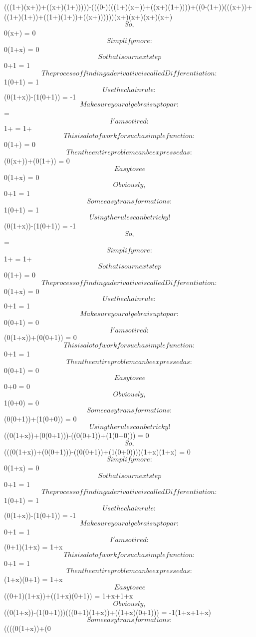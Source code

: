 \documentclass[12pt]{article}
\begin{document}
(((1+)\cdot (x+))+((x+)\cdot (1+)))))-(((0-)\cdot (((1+)\cdot (x+))+((x+)\cdot (1+))))+((0-(1+))\cdot ((\cdot (x+))+((1+)\cdot (1+))+((1+)\cdot (1+))+((x+)\cdot {})))))\cdot (x+)\cdot (x+)\cdot (x+)\cdot (x+)$$So, $$0\cdot (x+) = 0$$Simplify more: $$0\cdot (1+x) = 0$$So that is our next step$$0+1 = 1$$The process of finding a derivative is called Differentiation: $$1\cdot (0+1) = 1$$Use the chain rule: $$(0\cdot (1+x))-(1\cdot (0+1)) = -1$$Make sure your algebra is up to par: $$ = $$I'am so tired: $$1+ = 1+$$This is a lot of work for such a simple function: $$0\cdot (1+) = 0$$Then the entire problem can be expressed as: $$(0\cdot (x+))+(0\cdot (1+)) = 0$$Easy to see$$0\cdot (1+x) = 0$$Obviously, $$0+1 = 1$$Some easy transformations: $$1\cdot (0+1) = 1$$Using the rules can be tricky!$$(0\cdot (1+x))-(1\cdot (0+1)) = -1$$So, $$ = $$Simplify more: $$1+ = 1+$$So that is our next step$$0\cdot (1+) = 0$$The process of finding a derivative is called Differentiation: $$0\cdot (1+x) = 0$$Use the chain rule: $$0+1 = 1$$Make sure your algebra is up to par: $$0\cdot (0+1) = 0$$I'am so tired: $$(0\cdot (1+x))+(0\cdot (0+1)) = 0$$This is a lot of work for such a simple function: $$0+1 = 1$$Then the entire problem can be expressed as: $$0\cdot (0+1) = 0$$Easy to see$$0+0 = 0$$Obviously, $$1\cdot (0+0) = 0$$Some easy transformations: $$(0\cdot (0+1))+(1\cdot (0+0)) = 0$$Using the rules can be tricky!$$((0\cdot (1+x))+(0\cdot (0+1)))-((0\cdot (0+1))+(1\cdot (0+0))) = 0$$So, $$(((0\cdot (1+x))+(0\cdot (0+1)))-((0\cdot (0+1))+(1\cdot (0+0))))\cdot (1+x)\cdot (1+x) = 0$$Simplify more: $$0\cdot (1+x) = 0$$So that is our next step$$0+1 = 1$$The process of finding a derivative is called Differentiation: $$1\cdot (0+1) = 1$$Use the chain rule: $$(0\cdot (1+x))-(1\cdot (0+1)) = -1$$Make sure your algebra is up to par: $$0+1 = 1$$I'am so tired: $$(0+1)\cdot (1+x) = 1+x$$This is a lot of work for such a simple function: $$0+1 = 1$$Then the entire problem can be expressed as: $$(1+x)\cdot (0+1) = 1+x$$Easy to see$$((0+1)\cdot (1+x))+((1+x)\cdot (0+1)) = 1+x+1+x$$Obviously, $$((0\cdot (1+x))-(1\cdot (0+1)))\cdot (((0+1)\cdot (1+x))+((1+x)\cdot (0+1))) = -1\cdot (1+x+1+x)$$Some easy transformations: $$((((0\cdot (1+x))+(0\cdot 
\end{document}
